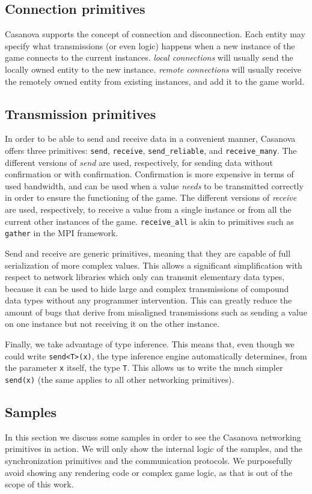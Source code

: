 \subsection{Connection primitives}
Casanova supports the concept of connection and disconnection. Each entity may specify what transmissions (or even logic) happens when a new instance of the game connects to the current instances. \textit{local connections} will usually send the locally owned entity to the new instance. \textit{remote connections} will usually receive the remotely owned entity from existing instances, and add it to the game world.

\subsection{Transmission primitives}
In order to be able to send and receive data in a convenient manner, Casanova offers three primitives: \texttt{send}, \texttt{receive},  \texttt{send\_reliable}, and \texttt{receive\_many}. The different versions of \textit{send} are used, respectively, for sending data without confirmation or with confirmation. Confirmation is more expensive in terms of used bandwidth, and can be used when a value \textit{needs} to be transmitted correctly in order to ensure the functioning of the game. The different versions of \textit{receive} are used, respectively, to receive a value from a single instance or from all the current other instances of the game. \texttt{receive\_all} is akin to primitives such as \texttt{gather} in the MPI framework.

Send and receive are generic primitives, meaning that they are capable of full serialization of more complex values. This allows a significant simplification with respect to network libraries which only can transmit elementary data types, because it can be used to hide large and complex transmissions of compound data types without any programmer intervention. This can greatly reduce the amount of bugs that derive from misaligned transmissions such as sending a value on one instance but not receiving it on the other instance. 

Finally, we take advantage of type inference. This means that, even though we could write \texttt{send<T>(x)}, the type inference engine automatically determines, from the parameter \texttt{x} itself, the type \texttt{T}. This allows us to write the much simpler \texttt{send(x)} (the same applies to all other networking primitives).

\subsection{Samples}
In this section we discuss some samples in order to see the Casanova networking primitives in action. We will only show the internal logic of the samples, and the synchronization primitives and the communication protocols. We purposefully avoid showing any rendering code or complex game logic, as that is out of the scope of this work.

